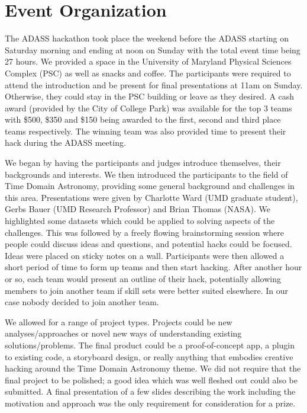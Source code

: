 \documentclass[11pt,twoside]{article}
\begin{document}
{\section{Event Organization}

The ADASS hackathon took place the weekend before the ADASS starting on Saturday morning and ending at noon on Sunday with the total event time being 27 hours. We provided a space in the University of Maryland Physical Sciences Complex (PSC) as well as snacks and coffee. The participants were required to attend the introduction and be present for final presentations at 11am on Sunday. Otherwise, they could stay in the PSC building or leave as they desired. A cash award (provided by the City of College Park) was available for the top 3 teams with \$500, \$350 and \$150 being awarded to the first, second and third place teams respectively. The winning team was also provided time to present their hack during the ADASS meeting.
 
We began by having the participants and judges introduce themselves, their backgrounds and interests.  We then introduced the participants to the field of Time Domain Astronomy, providing some general background and challenges in this area. Presentations were given by Charlotte Ward (UMD graduate student), Gerbs Bauer (UMD Research Professor) and Brian Thomas (NASA). We highlighted some datasets which could be applied to solving aspects of the challenges. This was followed by a freely flowing brainstorming session where people could discuss ideas and questions, and potential hacks could be focused. Ideas were placed on sticky notes on a wall. Participants were then allowed a short period of time to form up teams and then start hacking. After another hour or so, each team would present an outline of their hack, potentially allowing members to join another team if skill sets were better suited elsewhere. In our case nobody decided to join another team.

We allowed for a range of project types. Projects could be new analyses/approaches or novel new ways of understanding existing solutions/problems. The final product could be a proof-of-concept app, a plugin to existing code, a storyboard design, or really anything that embodies creative hacking around the Time Domain Astronomy theme. We did not require that the final project to be polished; a good idea which was well fleshed out could also be submitted. A final presentation of a few slides describing the work including the motivation and approach was the only requirement for consideration for a prize.

}
\end{document}
